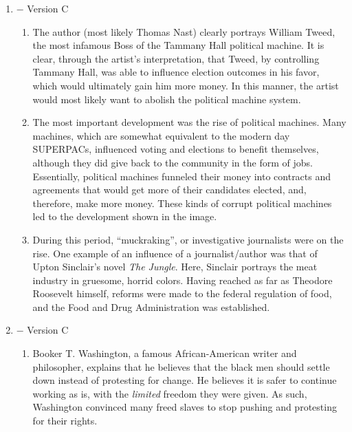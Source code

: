 \documentclass[12pt]{article}
\begin{document}
\begin{enumerate}

  \item $-$ Version C

    \begin{enumerate}

      \item The author (most likely Thomas Nast) clearly portrays William Tweed, the most infamous Boss of the Tammany Hall political machine. It is clear, through the artist's interpretation, that Tweed, by controlling Tammany Hall, was able to influence election outcomes in his favor, which would ultimately gain him more money. In this manner, the artist would most likely want to abolish the political machine system.

      \item The most important development was the rise of political machines. Many machines, which are somewhat equivalent to the modern day SUPERPACs, influenced voting and elections to benefit themselves, although they did give back to the community in the form of jobs. Essentially, political machines funneled their money into contracts and agreements that would get more of their candidates elected, and, therefore, make more money. These kinds of corrupt political machines led to the development shown in the image.

      \item During this period, ``muckraking'', or investigative journalists were on the rise. One example of an influence of a journalist/author was that of Upton Sinclair's novel \textit{The Jungle}. Here, Sinclair portrays the meat industry in gruesome, horrid colors. Having reached as far as Theodore Roosevelt himself, reforms were made to the federal regulation of food, and the Food and Drug Administration was established. 

    \end{enumerate}

  \item $-$ Version C

    \begin{enumerate}

      \item Booker T. Washington, a famous African-American writer and philosopher, explains that he believes that the black men should settle down instead of protesting for change. He believes it is safer to continue working as is, with the \textit{limited} freedom they were given. As such, Washington convinced many freed slaves to stop pushing and protesting for their rights.


\end{enumerate}
\end{enumerate}
\end{document}
